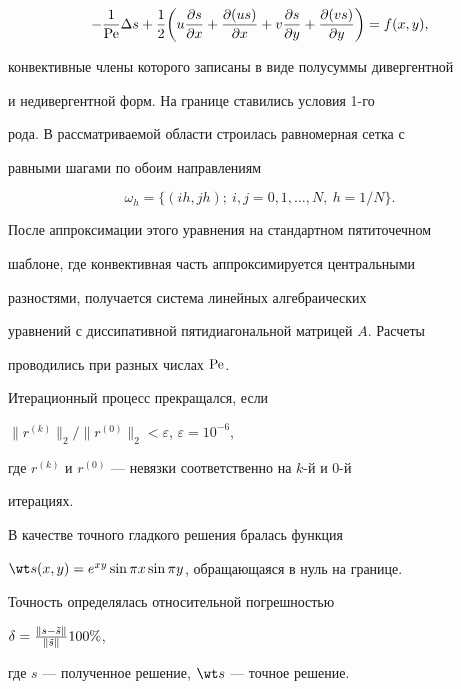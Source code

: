 $$ 


-\frac{1}{\Pe}\Delta s+\frac{1}{2}\bigg( 


u\frac{\partial s}{\partial x}+\frac{\partial(us)}{\partial x}+ 


v\frac{\partial s}{\partial y}+\frac{\partial(v s)}{\partial y} 


\bigg)=f(x,y), 


$$ 


конвективные члены которого записаны в виде полусуммы дивергентной  


и недивергентной форм. На границе ставились условия 1-го  


рода. В рассматриваемой области строилась равномерная сетка с  


равными шагами по обоим направлениям 


$$ 


\omega_h=\{(i h,j h);\ i,j=0,1,\dotsc,N,\ h=1/N\}. 


$$ 


 


После аппроксимации этого уравнения на стандартном пятиточечном  


шаблоне, где конвективная часть аппроксимируется центральными  


разностями, получается система линейных алгебраических  


уравнений с диссипативной пятидиагональной матрицей $A$. Расчеты  


проводились при разных числах $\operatorname{Pe}$.  


 


Итерационный процесс прекращался, если 


$\|r^{(k)}\|_2/\|r^{(0)}\|_2<\varepsilon$, $\varepsilon=10^{-6}$, 


где $r^{(k)}$ и $r^{(0)}$ --- невязки соответственно на $k$-й и $0$-й 


итерациях. 


 


В качестве точного гладкого решения бралась функция 


$\wt s(x,y)=e^{x y}\sin\pi x\sin\pi y$, обращающаяся в нуль на границе. 


Точность определялась относительной погрешностью 


$\delta=\frac{\|s-\Tilde s\|}{\|\Tilde s\|} 100\%$, 


где $s$ --- полученное решение, $\wt s$ --- точное решение. 


